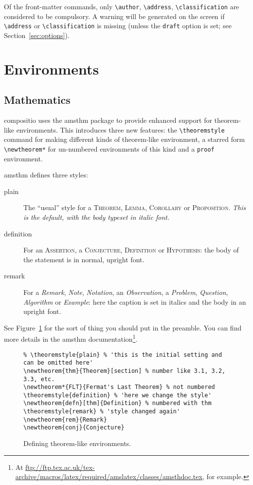 \documentclass[noams]{compositio}
\newcommand*{\pkg}[1]{{\mdseries\textsf{#1}}}
\begin{document}
Of the front-matter commands, only \verb+\author+, \verb+\address+,
\verb+\classification+ are considered to be compulsory. A warning
will be generated on the screen if \verb+\address+ or
\verb+\classification+ is missing (unless the \texttt{draft} option
is set; see Section~\ref{sec:options}).

\section{Environments}
\label{sec:Environments}

\subsection{Mathematics}
\label{sec:maths}

\pkg{compositio} uses the \textsf{amsthm} package to provide
enhanced support for theorem-like environments.  This introduces
three new features:  the \verb+\theoremstyle+ command for making
different kinds of theorem-like environment, a starred form
\verb+\newtheorem*+ for un-numbered environments of this kind and
a \texttt{proof} environment.

\textsf{amsthm} defines three styles:
  \begin{description}
  \item[plain] The ``usual'' style for a \textsc{Theorem},
  \textsc{Lemma}, \textsc{Corollary} or \textsc{Proposition}.
  \textit{This is the default, with the body typeset in italic
  font.}
  \item[definition] For an \textsc{Assertion}, a \textsc{Conjecture},
  \textsc{Definition} or \textsc{Hypothesis}:
  the body of the statement is in normal, upright font.
  \item[remark] For a \emph{Remark}, \emph{Note}, \emph{Notation},
  an \emph{Observation}, a \emph{Problem}, \emph{Question},
  \emph{Algorithm} or \emph{Example}: here the caption is set in
  italics and the body in an upright font.
 \end{description}
See Figure~\ref{fig:2} for the sort of thing you should put in the
preamble.  You can find more details in the \pkg{amsthm}
documentation\footnote{At
\url{ftp://ftp.tex.ac.uk/tex-archive/macros/latex/required/amslatex/classes/amsthdoc.tex},
for \mbox{example}.}.
\begin{figure}[htbp]
\begin{center}
\begin{minipage}{15cm}\small\begin{verbatim}
% \theoremstyle{plain} % 'this is the initial setting and can be omitted here'
\newtheorem{thm}{Theorem}[section] % number like 3.1, 3.2, 3.3, etc.
\newtheorem*{FLT}{Fermat's Last Theorem} % not numbered
\theoremstyle{definition} % 'here we change the style'
\newtheorem{defn}[thm]{Definition} % numbered with thm
\theoremstyle{remark} % 'style changed again'
\newtheorem{rem}{Remark}
\newtheorem{conj}{Conjecture}
\end{verbatim}
\end{minipage}
\end{center}
\caption{Defining theorem-like environments.} \label{fig:2}
\end{figure}
\end{document}
